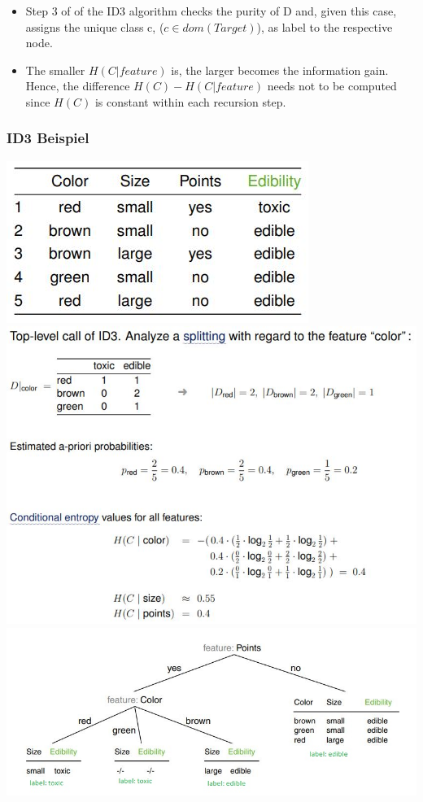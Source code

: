 \documentclass[11pt,a4paper]{article}
\begin{document}
\begin{flushleft}
\begin{itemize}
\item Step 3 of of the ID3 algorithm checks the purity of D and, given this case, assigns the unique
class c, ($c \in  dom(Target)$), as label to the respective node.
\item The smaller $H(C | feature)$ is, the larger becomes the information gain. Hence, the difference
$H(C) - H(C | feature)$ needs not to be computed since $H(C)$ is constant within each recursion step.
\end{itemize}

\subsubsection{ID3 Beispiel}
\includegraphics[width = \textwidth]{Pilze}
\includegraphics[width = \textwidth]{ID3Pilze}
\includegraphics[width = \textwidth]{ID3Baum}


\end{flushleft}
\end{document}
